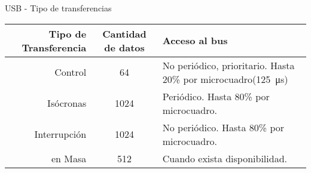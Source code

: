 

\begin{frame}{USB - Tipo de transferencias}
\centering
\begin{tabulary}{\textwidth}{|R||C|L|}
	\hline
	Tipo de Transferencia&Cantidad de datos&Acceso al bus\\
	\hline Control&64&No periódico, prioritario. Hasta 20\% por microcuadro(\SI{125}{\micro\second})\\
	Isócronas&1024&Periódico. Hasta 80\% por microcuadro.\\
	Interrupción&1024&No periódico. Hasta 80\% por microcuadro.\\
	en Masa&512&Cuando exista disponibilidad.\\
	\hline
\end{tabulary}
\end{frame}

